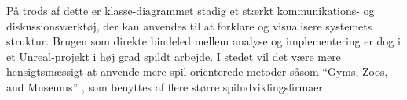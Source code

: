 På trods af dette er klasse-diagrammet stadig et stærkt kommunikations- og diskussionsværktøj, der kan anvendes til at forklare og visualisere systemets struktur. Brugen som direkte bindeled mellem analyse og implementering er dog i et Unreal-projekt i høj grad spildt arbejde. I stedet vil det være mere hensigtsmæssigt at anvende mere spil-orienterede metoder såsom “Gyms, Zoos, and Museums” \Cite{Storm2026}, som benyttes af flere større spiludviklingsfirmaer.
